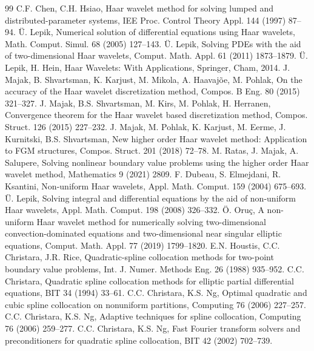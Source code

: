 \documentclass[preprint,12pt]{elsarticle}
\theoremstyle{remark}
\begin{document}
\begin{thebibliography}{99}
 C.F. Chen, C.H. Hsiao, Haar wavelet method for solving lumped and distributed-parameter systems, IEE Proc. Control Theory Appl. 144 (1997) 87--94.
 \"U. Lepik, Numerical solution of differential equations using Haar wavelets, Math. Comput. Simul. 68 (2005) 127--143.
 \"U. Lepik, Solving PDEs with the aid of two-dimensional Haar wavelets, Comput. Math. Appl. 61 (2011) 1873--1879.
 \"U. Lepik, H. Hein, Haar Wavelets: With Applications, Springer, Cham, 2014.
 J. Majak, B. Shvartsman, K. Karjust, M. Mikola, A. Haavaj\~oe, M. Pohlak, On the accuracy of the Haar wavelet discretization method, Compos. B Eng. 80 (2015) 321--327.
 J. Majak, B.S. Shvartsman, M. Kirs, M. Pohlak, H. Herranen, Convergence theorem for the Haar wavelet based discretization method, Compos. Struct. 126 (2015) 227--232.
 J. Majak, M. Pohlak, K. Karjust, M. Eerme, J. Kurnitski, B.S. Shvartsman, New higher order Haar wavelet method: Application to FGM structures, Compos. Struct. 201 (2018) 72--78.
 M. Ratas, J. Majak, A. Salupere, Solving nonlinear boundary value problems using the higher order Haar wavelet method, Mathematics 9 (2021) 2809.
 F. Dubeau, S. Elmejdani, R. Ksantini, Non-uniform Haar wavelets, Appl. Math. Comput. 159 (2004) 675--693.
 \"U. Lepik, Solving integral and differential equations by the aid of non-uniform Haar wavelets, Appl. Math. Comput. 198 (2008) 326--332.
 \"O. Oru\c{c}, A non-uniform Haar wavelet method for numerically solving two-dimensional convection-dominated equations and two-dimensional near singular elliptic equations, Comput. Math. Appl. 77 (2019) 1799--1820.
 E.N. Houstis, C.C. Christara, J.R. Rice, Quadratic-spline collocation methods for two-point boundary value problems, Int. J. Numer. Methods Eng. 26 (1988) 935--952.
 C.C. Christara, Quadratic spline collocation methods for elliptic partial differential equations, BIT 34 (1994) 33--61.
 C.C. Christara, K.S. Ng, Optimal quadratic and cubic spline collocation on nonuniform partitions, Computing 76 (2006) 227--257.
 C.C. Christara, K.S. Ng, Adaptive techniques for spline collocation, Computing 76 (2006) 259--277.
 C.C. Christara, K.S. Ng, Fast Fourier transform solvers and preconditioners for quadratic spline collocation, BIT 42 (2002) 702--739.

\end{thebibliography}
\end{document}
